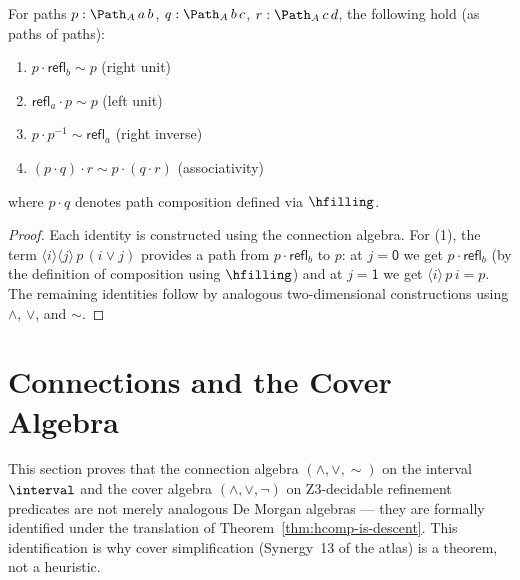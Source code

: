 \begin{proposition}
\label{prop:groupoid}
For paths $p : \Path_A\, a\, b$, $q : \Path_A\, b\, c$,
$r : \Path_A\, c\, d$, the following hold (as paths of paths):
\begin{enumerate}
\item $p \cdot \mathsf{refl}_b \sim p$ \quad (right unit)
\item $\mathsf{refl}_a \cdot p \sim p$ \quad (left unit)
\item $p \cdot p^{-1} \sim \mathsf{refl}_a$ \quad (right inverse)
\item $(p \cdot q) \cdot r \sim p \cdot (q \cdot r)$ \quad (associativity)
\end{enumerate}
where $p \cdot q$ denotes path composition defined via $\hfilling$.
\end{proposition}

\begin{proof}
Each identity is constructed using the connection algebra.  For (1),
the term $\langle i\rangle\langle j\rangle\, p\,(i \vee j)$ provides
a path from $p \cdot \mathsf{refl}_b$ to $p$: at $j = \mathsf{0}$ we
get $p \cdot \mathsf{refl}_b$ (by the definition of composition using
$\hfilling$) and at $j = \mathsf{1}$ we get $\langle i \rangle\, p\,i = p$.
The remaining identities follow by analogous two-dimensional constructions
using $\wedge$, $\vee$, and $\sim$.
\end{proof}


\section{Connections and the Cover Algebra}
\label{sec:connections-cover-algebra}

This section proves that the connection algebra $(\wedge, \vee, \sim)$ on the
interval $\interval$ and the cover algebra $(\wedge, \vee, \neg)$ on
Z3-decidable refinement predicates are not merely analogous De Morgan algebras
--- they are formally identified under the translation of
Theorem~\ref{thm:hcomp-is-descent}.  This identification is why cover
simplification (Synergy~13 of the atlas) is a theorem, not a heuristic.


